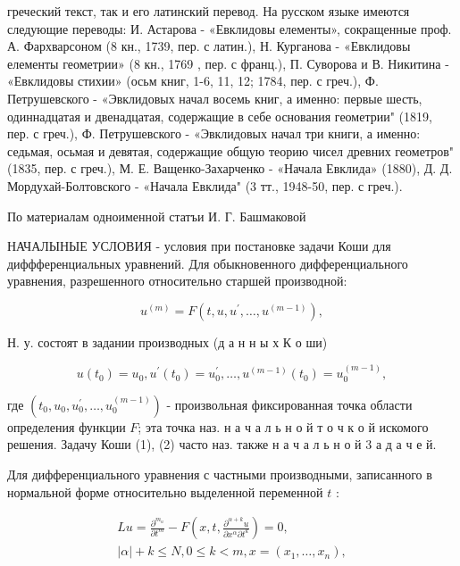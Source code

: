 \documentclass[10pt]{article}
\begin{document}
греческий текст, так и его латинский перевод. На русском языке имеются следующие переводы: И. Астарова - «Евклидовы елементы», сокращенные проф. А. Фархварсоном (8 кн., 1739, пер. с латин.), Н. Курганова - «Евклидовы елементы геометрии» (8 кн., 1769 , пер. с франц.), П. Суворова и В. Никитина - «Евклидовы стихии» (осьм книг, 1-6, 11, 12; 1784, пер. с греч.), Ф. Петрушевского - «Эвклидовых начал восемь книг, а именно: первые шесть, одиннадцатая и двенадцатая, содержащие в себе основания геометрии" (1819, пер. с греч.), Ф. Петрушевского - «Эвклидовых начал три книги, а именно: седьмая, осьмая и девятая, содержащие общую теорию чисел древних геометров" (1835, пер. с греч.), М. Е. Ващенко-Захарченко - «Начала Евклида» (1880), Д. Д. Мордухай-Болтовского - «Начала Евклида" (3 тт., 1948-50, пер. с греч.).



По материалам одноименной статъи И. Г. Башмаковой



НАЧАЛЫНЫЕ УСЛОВИЯ - условия при постановке задачи Коши для диффференциальных уравнений. Для обыкновенного дифференциального уравнения, разрешенного относительно старшей производной:



\[

u^{(m)}=F\left(t, u, u^{\prime}, \ldots, u^{(m-1)}\right),

\]



Н. у. состоят в задании производных (д а н н ы х К о ши)



\[

u\left(t_{0}\right)=u_{0}, u^{\prime}\left(t_{0}\right)=u_{0}^{\prime}, \ldots, u^{(m-1)}\left(t_{0}\right)=u_{0}^{(m-1)},

\]



где $\left(t_{0}, u_{0}, u_{0}^{\prime}, \ldots, u_{0}^{(m-1)}\right)$ - произвольная фиксированная точка области определения функции $F$; эта точка наз. н а ч а л ь н о й т о ч к о й искомого решения. Задачу Коши (1), (2) часто наз. также н а ч а л ь н о й 3 а д а ч е й.



Для дифференциального уравнения с частными производными, записанного в нормальной форме относительно выделенной переменной $t$ :



\[

\begin{gathered}

L u=\frac{\partial^{m_{u}}}{\partial t^{m}}-F\left(x, t, \frac{\partial^{\alpha+k} u}{\partial x^{\alpha} \partial t^{k}}\right)=0, \\

|\alpha|+k \leqslant N, 0 \leqslant k<m, x=\left(x_{1}, \ldots, x_{n}\right),

\end{gathered}

\]
\end{document}
